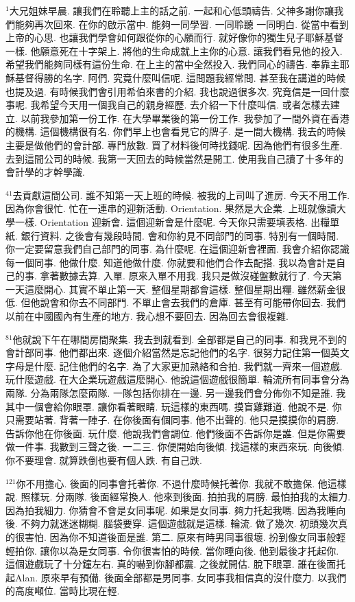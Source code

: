 \documentclass{book}
\begin{document}
$^{1}$大兄姐妹早晨.
讓我們在聆聽上主的話之前.
一起和心低頭禱告.
父神多謝你讓我們能夠再次回來.
在你的啟示當中.
能夠一同學習.
一同聆聽 一同明白.
從當中看到上帝的心思.
也讓我們學會如何跟從你的心願而行.
就好像你的獨生兒子耶穌基督一樣.
他願意死在十字架上.
將他的生命成就上主你的心意.
讓我們看見他的投入.
希望我們能夠同樣有這份生命.
在上主的當中全然投入.
我們同心的禱告.
奉靠主耶穌基督得勝的名字.
阿們.
究竟什麼叫信呢.
這問題我經常問.
甚至我在講道的時候也提及過.
有時候我們會引用希伯來書的介紹.
我也說過很多次.
究竟信是一回什麼事呢.
我希望今天用一個我自己的親身經歷.
去介紹一下什麼叫信.
或者怎樣去建立.
以前我參加第一份工作.
在大學畢業後的第一份工作.
我參加了一間外資在香港的機構.
這個機構很有名.
你們早上也會看見它的牌子.
是一間大機構.
我去的時候主要是做他們的會計部.
專門放數.
買了材料後何時找錢呢.
因為他們有很多生產.
去到這間公司的時候.
我第一天回去的時候當然是開工.
使用我自己讀了十多年的會計學的才幹學識.

$^{41}$去貢獻這間公司.
誰不知第一天上班的時候.
被我的上司叫了進房.
今天不用工作.
因為你會很忙.
忙在一連串的迎新活動.
Orientation.
果然是大企業.
上班就像讀大學一樣.
Orientation 迎新會.
這個迎新會是什麼呢.
今天你只需要填表格.
出糧單紙.
銀行資料.
之後會有幾段時間.
會和你約見不同部門的同事.
特別有一個時間.
你一定要留意我們自己部門的同事.
為什麼呢.
在這個迎新會裡面.
我會介紹你認識每一個同事.
他做什麼.
知道他做什麼.
你就要和他們合作去配搭.
我以為會計是自己的事.
拿著數據去算.
入單.
原來入單不用我.
我只是做沒碰盤數就行了.
今天第一天這麼開心.
其實不單止第一天.
整個星期都會這樣.
整個星期出糧.
雖然薪金很低.
但他說會和你去不同部門.
不單止會去我們的倉庫.
甚至有可能帶你回去.
我們以前在中國國內有生產的地方.
我心想不要回去.
因為回去會很複雜.

$^{81}$他就說下午在哪間房間聚集.
我去到就看到.
全部都是自己的同事.
和我見不到的會計部同事.
他們都出來.
逐個介紹當然是忘記他們的名字.
很努力記住第一個英文字母是什麼.
記住他們的名字.
為了大家更加熟絡和合拍.
我們就一齊來一個遊戲.
玩什麼遊戲.
在大企業玩遊戲這麼開心.
他說這個遊戲很簡單.
輪流所有同事會分為兩隊.
分為兩隊怎麼兩隊.
一隊包括你排在一邊.
另一邊我們會分佈你不知是誰.
我其中一個會給你眼罩.
讓你看著眼睛.
玩這樣的東西嗎.
摸盲雞難道.
他說不是.
你只需要站著.
背著一陣子.
在你後面有個同事.
他不出聲的.
他只是摸摸你的肩膀.
告訴你他在你後面.
玩什麼.
他說我們會調位.
他們後面不告訴你是誰.
但是你需要做一件事.
我數到三聲之後.
一二三.
你便開始向後傾.
找這樣的東西來玩.
向後傾.
你不要理會.
就算跌倒也要有個人跌.
有自己跌.

$^{121}$你不用擔心.
後面的同事會托著你.
不過什麼時候托著你.
我就不敢擔保.
他這樣說.
照樣玩.
分兩隊.
後面經常換人.
他來到後面.
拍拍我的肩膀.
最怕拍我的太細力.
因為拍我細力.
你猜會不會是女同事呢.
如果是女同事.
夠力托起我嗎.
因為我睡向後.
不夠力就迷迷糊糊.
腦袋要穿.
這個遊戲就是這樣.
輪流.
做了幾次.
初頭幾次真的很害怕.
因為你不知道後面是誰.
第二.
原來有時男同事很壞.
扮到像女同事般輕輕拍你.
讓你以為是女同事.
令你很害怕的時候.
當你睡向後.
他到最後才托起你.
這個遊戲玩了十分鐘左右.
真的嚇到你腳都震.
之後就開估.
脫下眼罩.
誰在後面托起Alan.
原來早有預備.
後面全部都是男同事.
女同事我相信真的沒什麼力.
以我們的高度噸位.
當時比現在輕.
\end{document}
